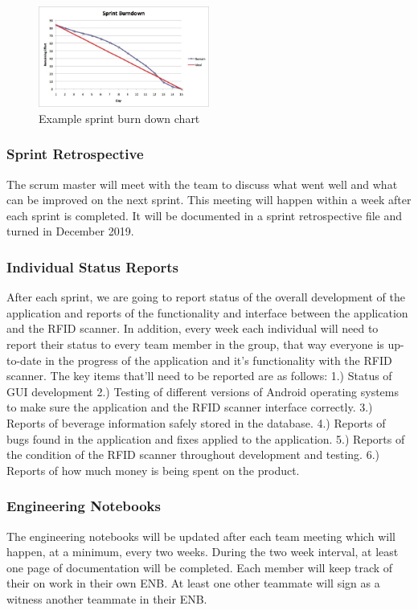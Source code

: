 \begin{figure}[h!]
    \centering
    \includegraphics[width=0.5\textwidth]{images/Sprint_Burndown}
    \caption{Example sprint burn down chart}
\end{figure}

\subsubsection{Sprint Retrospective}
The scrum master will meet with the team to discuss what went well and what can be improved on the next sprint. This meeting will happen within a week after each sprint is completed. It will be documented in a sprint retrospective file and turned in December 2019.

\subsubsection{Individual Status Reports}
After each sprint, we are going to report status of the overall development of the application and reports of the functionality and interface between the application and the RFID scanner.  In addition, every week each individual will need to report their status to every team member in the group, that way everyone is up-to-date in the progress of the application and it's functionality with the RFID scanner.  The key items that'll need to be reported are as follows:
1.) Status of GUI development
2.) Testing of different versions of Android operating systems to make sure the application and the RFID scanner interface correctly.
3.) Reports of beverage information safely stored in the database.
4.) Reports of bugs found in the application and fixes applied to the application.
5.) Reports of the condition of the RFID scanner throughout development and testing.
6.) Reports of how much money is being spent on the product.

\subsubsection{Engineering Notebooks}
The engineering notebooks will be updated after each team meeting which will happen, at a minimum, every two weeks. During the two week interval, at least one page of documentation will be completed. Each member will keep track of their on work in their own ENB. At least one other teammate will sign as a witness another teammate in their ENB.


